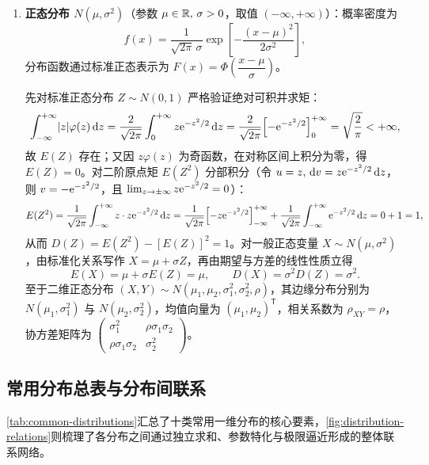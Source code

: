 \begin{enumerate}
  \item \textbf{正态分布 $N(\mu,\sigma^2)$}（参数 $\mu\in\mathbb{R},\,\sigma>0$，取值 $(-\infty,+\infty)$）：概率密度为
  \[
    f(x)=\frac{1}{\sqrt{2\pi}\,\sigma}\exp\!\left[-\frac{(x-\mu)^2}{2\sigma^2}\right],
  \]
  分布函数通过标准正态表示为 $F(x)=\Phi\!\left(\dfrac{x-\mu}{\sigma}\right)$。

  先对标准正态分布 $Z\sim N(0,1)$ 严格验证绝对可积并求矩：
  \[
    \int_{-\infty}^{+\infty}\lvert z\rvert\varphi(z)\mathop{}\!\mathrm{d} z
    =\frac{2}{\sqrt{2\pi}}\int_{0}^{+\infty}z\mathrm{e}^{-z^2/2}\mathop{}\!\mathrm{d} z
    =\frac{2}{\sqrt{2\pi}}\Bigl[-\mathrm{e}^{-z^2/2}\Bigr]_{0}^{+\infty}
    =\sqrt{\frac{2}{\pi}}<+\infty,
  \]
  故 $E(Z)$ 存在；又因 $z\varphi(z)$ 为奇函数，在对称区间上积分为零，得 $E(Z)=0$。对二阶原点矩 $E(Z^2)$ 分部积分（令 $u=z,\,\mathop{}\!\mathrm{d} v=z\mathrm{e}^{-z^2/2}\mathop{}\!\mathrm{d} z$，则 $v=-\mathrm{e}^{-z^2/2}$，且 $\lim_{z\to\pm\infty}z\mathrm{e}^{-z^2/2}=0$）：
  \[
    E(Z^2)=\frac{1}{\sqrt{2\pi}}\int_{-\infty}^{+\infty}z\cdot z\mathrm{e}^{-z^2/2}\mathop{}\!\mathrm{d} z
    =\frac{1}{\sqrt{2\pi}}\Bigl[-z\mathrm{e}^{-z^2/2}\Bigr]_{-\infty}^{+\infty}
    +\frac{1}{\sqrt{2\pi}}\int_{-\infty}^{+\infty}\mathrm{e}^{-z^2/2}\mathop{}\!\mathrm{d} z
    =0+1=1,
  \]
  从而 $D(Z)=E(Z^2)-[E(Z)]^2=1$。对一般正态变量 $X\sim N(\mu,\sigma^2)$，由标准化关系写作 $X=\mu+\sigma Z$，再由期望与方差的线性性质立得
  \[
    E(X)=\mu+\sigma E(Z)=\mu,\qquad
    D(X)=\sigma^2 D(Z)=\sigma^2.
  \]
  至于二维正态分布 $(X,Y)\sim N(\mu_1,\mu_2,\sigma_1^2,\sigma_2^2,\rho)$，其边缘分布分别为 $N(\mu_1,\sigma_1^2)$ 与 $N(\mu_2,\sigma_2^2)$，均值向量为 $(\mu_1,\mu_2)^{\mathsf{T}}$，相关系数为 $\rho_{XY}=\rho$，协方差矩阵为 $\begin{pmatrix} \sigma_1^2 & \rho\sigma_1\sigma_2 \\ \rho\sigma_1\sigma_2 & \sigma_2^2 \end{pmatrix}$。
\end{enumerate}

\subsection{常用分布总表与分布间联系}

\cref{tab:common-distributions}汇总了十类常用一维分布的核心要素，\cref{fig:distribution-relations}则梳理了各分布之间通过独立求和、参数特化与极限逼近形成的整体联系网络。

